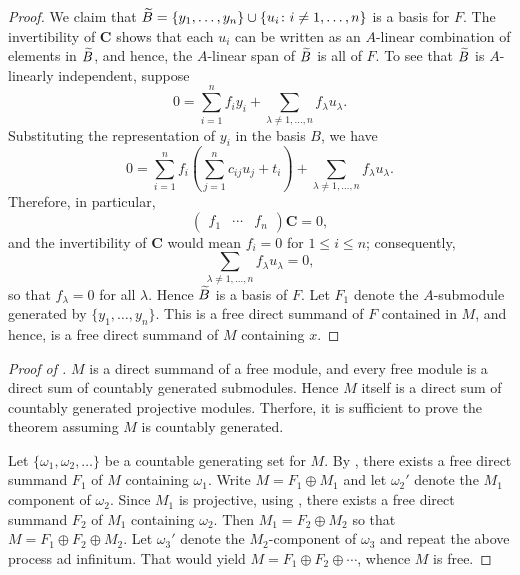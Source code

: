 \begin{proof}
    We claim that $\widetilde{B} = \{y_1,\dots,y_n\}\cup\{u_i\colon i\ne 1,\dots,n\}$ is a basis for $F$. The invertibility of $\mathbf C$ shows that each $u_i$ can be written as an $A$-linear combination of elements in $\widetilde{B}$, and hence, the $A$-linear span of $\widetilde{B}$ is all of $F$. To see that $\widetilde{B}$ is $A$-linearly independent, suppose 
    \begin{equation*}
        0 = \sum_{i = 1}^n f_iy_i + \sum_{\lambda\ne 1,\dots,n} f_\lambda u_\lambda.
    \end{equation*}
    Substituting the representation of $y_i$ in the basis $B$, we have 
    \begin{equation*}
        0 = \sum_{i = 1}^n f_i\left(\sum_{j = 1}^n c_{ij}u_j + t_i\right) + \sum_{\lambda\ne 1,\dots, n}f_\lambda u_\lambda.
    \end{equation*}
    Therefore, in particular, 
    \begin{equation*}
        \begin{pmatrix}
            f_1 & \cdots & f_n
        \end{pmatrix}\mathbf C = 0,
    \end{equation*}
    and the invertibility of $\mathbf C$ would mean $f_i = 0$ for $1\le i\le n$; consequently, 
    \begin{equation*}
        \sum_{\lambda\ne 1,\dots, n} f_\lambda u_\lambda = 0,
    \end{equation*}
    so that $f_\lambda = 0$ for all $\lambda$. Hence $\widetilde{B}$ is a basis of $F$. Let $F_1$ denote the $A$-submodule generated by $\{y_1,\dots,y_n\}$. This is a free direct summand of $F$ contained in $M$, and hence, is a free direct summand of $M$ containing $x$.
\end{proof}

\begin{proof}[Proof of ]
    $M$ is a direct summand of a free module, and every free module is a direct sum of countably generated submodules. Hence $M$ itself is a direct sum of countably generated projective modules. Therfore, it is sufficient to prove the theorem assuming $M$ is countably generated. 

    Let $\{\omega_1,\omega_2,\dots\}$ be a countable generating set for $M$. By , there exists a free direct summand $F_1$ of $M$ containing $\omega_1$. Write $M = F_1\oplus M_1$ and let $\omega_2'$ denote the $M_1$ component of $\omega_2$. Since $M_1$ is projective, using , there exists a free direct summand $F_2$ of $M_1$ containing $\omega_2$. Then $M_1 = F_2\oplus M_2$ so that $M = F_1\oplus F_2\oplus M_2$. Let $\omega_3'$ denote the $M_2$-component of $\omega_3$ and repeat the above process ad infinitum. That would yield $M = F_1\oplus F_2\oplus\cdots$, whence $M$ is free.
\end{proof}

